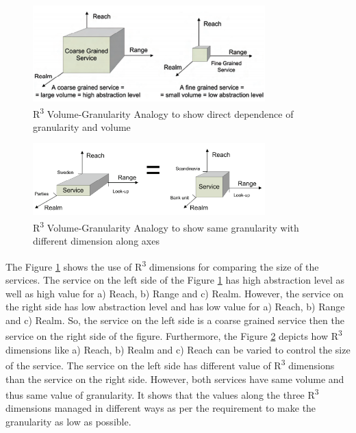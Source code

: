 \begin{figure}[H]
\begin{center}
\includegraphics[width=0.8\textwidth]{figures/Granularity-R3-three}
\caption{R\textsuperscript{3} Volume-Granularity Analogy to show direct dependence of granularity and volume \cite{Pierre-Reldin:2007aa}}
\label{fig:R3 volume-granularity analogy greater}
\end{center}
\end{figure}

\begin{figure}[H]
\begin{center}
\includegraphics[width=0.8\textwidth]{figures/Granularity-R3-four}
\caption{R\textsuperscript{3} Volume-Granularity Analogy to show same granularity with different dimension along axes \cite{Pierre-Reldin:2007aa}}
\label{fig:R3 volume-granularity analogy equal}
\end{center}
\end{figure}
The Figure \ref{fig:R3 volume-granularity analogy greater} shows the use of R\textsuperscript{3} dimensions for comparing the size of the services. The service on the left side of the Figure \ref{fig:R3 volume-granularity analogy greater} has high abstraction level as well as high value for a) Reach, b) Range and c) Realm. However, the service on the right side has low abstraction level and has low value for a) Reach, b) Range and c) Realm. So, the service on the left side is a coarse grained service then the service on the right side of the figure.
Furthermore, the Figure \ref{fig:R3 volume-granularity analogy equal} depicts how R\textsuperscript{3} dimensions like a) Reach, b) Realm and c) Reach can be varied to control the size of the service. The service on the left side has different value of R\textsuperscript{3} dimensions than the service on the right side. However, both services have same volume and thus same value of granularity. It shows that the values along the three R\textsuperscript{3} dimensions managed in different ways as per the requirement to make the granularity as low as possible. 


